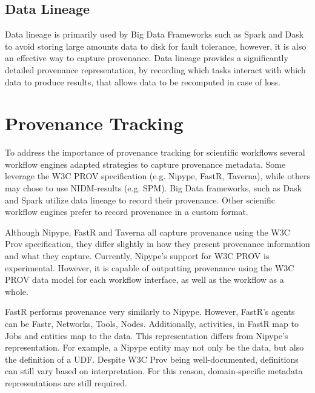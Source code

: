 \documentclass{report}
\begin{document}
            \subsection{Data Lineage}
                Data lineage is primarily used by Big Data Frameworks such as 
                Spark and Dask to avoid storing large amounts data to disk for
                fault tolerance, however, it is also an effective way to capture
                provenance. Data lineage provides a significantly detailed 
                provenance representation, by recording which tasks interact with
                which data to produce results, that allows data to be recomputed 
                in case of loss. 

        \section{Provenance Tracking}\label{prov}

            To address the importance of provenance tracking for scientific 
            workflows several workflow engines adapted strategies to capture 
            provenance metadata. Some leverage the W3C PROV specification (e.g.
            Nipype, FastR, Taverna), while others may chose to use NIDM-results (e.g. 
            SPM). Big Data frameworks, such as Dask and Spark utilize data lineage
            to record their provenance. Other scienific workflow engines prefer 
            to record provenance in a custom format.

            Although Nipype, FastR and Taverna all capture provenance using 
            the W3C Prov specification, they differ slightly in how they
            present provenance
            information and what they capture.
            Currently, Nipype's support for W3C PROV is experimental. However,
            it is capable of outputting provenance using the W3C PROV data 
            model for each workflow interface, as well as the workflow as a 
            whole.
    
            FastR performs provenance very similarly to Nipype. However,
            FastR's agents can be Fastr, Networks, Tools, Nodes. Additionally,
            activities, in
            FastR map to Jobs and entities map to the data. This representation
            differs from Nipype's representation. For example, a Nipype entity
            may not only be the data, but also the definition of a UDF. Despite
            W3C Prov being well-documented, definitions can still vary based on 
            interpretation. For this reason, domain-specific metadata representations
            are still required.
    
\end{document}
